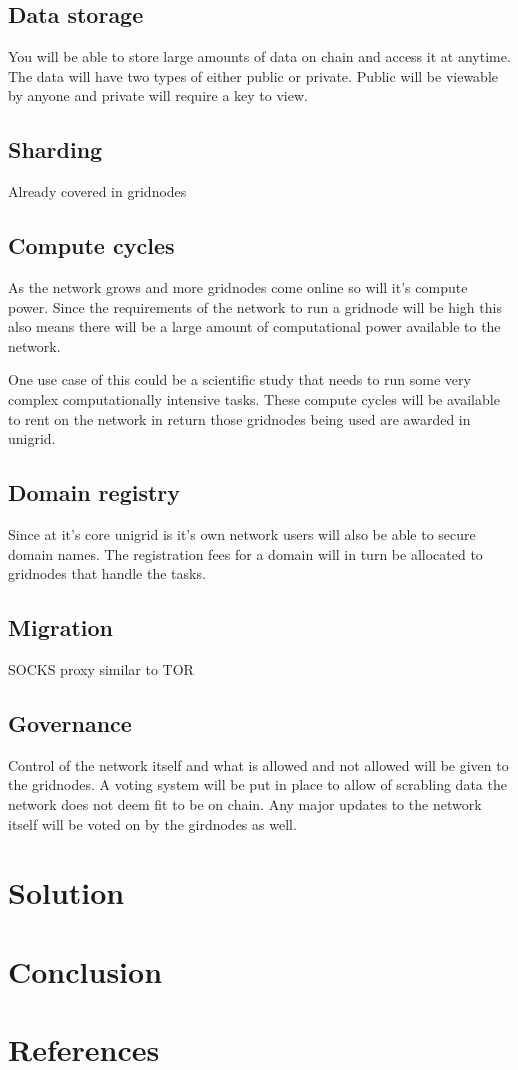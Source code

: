 \documentclass[12pt]{article}
\begin{document}
\subsection*{Data storage}
You will be able to store large amounts of data on chain and access it at anytime. The data will have two types of either public or private. Public will be viewable by anyone and private will require a key to view.

\subsection*{Sharding}
Already covered in gridnodes

\subsection*{Compute cycles}
As the network grows and more gridnodes come online so will it's compute power. Since the requirements of the network to run a gridnode will be high this also means there will be a large amount of computational power available to the network.

One use case of this could be a scientific study that needs to run some very complex computationally intensive tasks. These compute cycles will be available to rent on the network in return those gridnodes being used are awarded in unigrid.

\subsection*{Domain registry}
Since at it's core unigrid is it's own network users will also be able to secure domain names. The registration fees for a domain will in turn be allocated to gridnodes that handle the tasks.

\subsection*{Migration }
SOCKS proxy similar to TOR

\subsection*{Governance}
Control of the network itself and what is allowed and not allowed will be given to the gridnodes. A voting system will be put in place to allow of scrabling data the network does not deem fit to be on chain. Any major updates to the network itself will be voted on by the girdnodes as well.

\section*{Solution}

\section*{Conclusion}

\section*{References}
\end{document}
